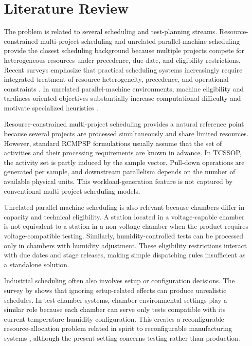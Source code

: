 \documentclass[11pt]{article}
\begin{document}
\section{Literature Review}
\label{sec:literature_review}

The problem is related to several scheduling and test-planning streams. Resource-constrained multi-project scheduling and unrelated parallel-machine scheduling provide the closest scheduling background because multiple projects compete for heterogeneous resources under precedence, due-date, and eligibility restrictions. Recent surveys emphasize that practical scheduling systems increasingly require integrated treatment of resource heterogeneity, precedence, and operational constraints \citep{HartmannBriskorn2022,GomezSanchezLallaRuizFernandezGilCastroVoss2023}. In unrelated parallel-machine environments, machine eligibility and tardiness-oriented objectives substantially increase computational difficulty and motivate specialized heuristics \citep{UlagaDurasevicJakobovic2022,MaeckerShenMonch2023}.

Resource-constrained multi-project scheduling provides a natural reference point because several projects are processed simultaneously and share limited resources. However, standard RCMPSP formulations usually assume that the set of activities and their processing requirements are known in advance. In TCSSOP, the activity set is partly induced by the sample vector. Pull-down operations are generated per sample, and downstream parallelism depends on the number of available physical units. This workload-generation feature is not captured by conventional multi-project scheduling models.

Unrelated parallel-machine scheduling is also relevant because chambers differ in capacity and technical eligibility. A station located in a voltage-capable chamber is not equivalent to a station in a non-voltage chamber when the product requires voltage-compatible testing. Similarly, humidity-controlled tests can be processed only in chambers with humidity adjustment. These eligibility restrictions interact with due dates and stage releases, making simple dispatching rules insufficient as a standalone solution.

Industrial scheduling often also involves setup or configuration decisions. The survey by \citet{Allahverdi2015} shows that ignoring setup-related effects can produce unrealistic schedules. In test-chamber systems, chamber environmental settings play a similar role because each chamber can serve only tests compatible with its current temperature-humidity configuration. This creates a reconfigurable resource-allocation problem related in spirit to reconfigurable manufacturing systems \citep{Koren1999,MehrabiUlsoyKoren2000}, although the present setting concerns testing rather than production.
\end{document}
